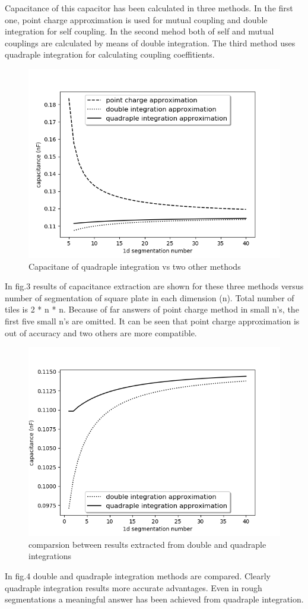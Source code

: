 \documentclass[twoside,twocolumn]{article}
\begin{document}
Capacitance of this capacitor has been calculated in three methods. In the first one, point charge approximation is used for mutual coupling and double integration for self coupling. In the second mehod both of self and mutual couplings are calculated by means of double integration. The third method uses quadraple integration for calculating coupling coeffitients. 
\begin {figure}[h]
	\center
	\includegraphics[width=\linewidth]	{saeedvshitoshiandzho.png}
	\caption{Capacitane of quadraple integration vs two other methods}
\end{figure}

In fig.3 results of capacitance extraction are shown for these three methods versus number of segmentation of square plate in each dimension (n). Total number of tiles is 2 * n * n. Because of far answers of point charge method in small n's, the first five small n's are omitted. It can be seen that point charge approximation is out of accuracy and two others are more compatible. 
\begin {figure}[h]
	\center
	\includegraphics[width=\linewidth]	{saeedvshitoshi.png}
	\caption{comparsion between results extracted from double and quadraple integrations}
\end{figure}

In fig.4 double and quadraple integration methods are compared. Clearly quadraple integration results more accurate advantages. Even in rough segmentations a meaningful answer has been achieved from quadraple integration.
\end{document}
